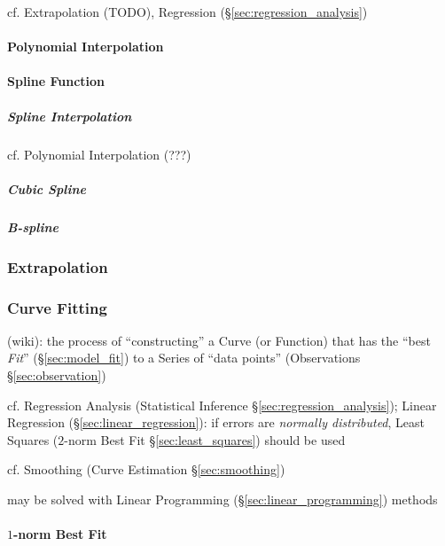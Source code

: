 cf. Extrapolation (TODO), Regression (\S\ref{sec:regression_analysis})



\paragraph{Polynomial Interpolation}\label{sec:polynomial_interpolation}\hfill

\paragraph{Spline Function}\label{sec:spline}\hfill

\subparagraph{Spline Interpolation}\label{sec:spline_interpolation}\hfill

cf. Polynomial Interpolation (???) %



\subparagraph{Cubic Spline}\label{sec:cubic_spline}\hfill

\subparagraph{B-spline}\label{sec:b_spline}\hfill



\subsubsection{Extrapolation}\label{sec:extrapolation}

\subsubsection{Curve Fitting}\label{sec:curve_fitting}

(wiki): the process of ``constructing'' a Curve (or Function) that has the
``best \emph{Fit}'' (\S\ref{sec:model_fit}) to a Series of ``data points''
(Observations \S\ref{sec:observation})

\fist cf. Regression Analysis (Statistical Inference
\S\ref{sec:regression_analysis}); Linear Regression
(\S\ref{sec:linear_regression}): if errors are \emph{normally distributed},
Least Squares ($2$-norm Best Fit \S\ref{sec:least_squares}) should be used

cf. Smoothing (Curve Estimation \S\ref{sec:smoothing})

may be solved with Linear Programming (\S\ref{sec:linear_programming}) methods



\paragraph{$1$-norm Best Fit}\label{sec:1norm_best_fit}\hfill

